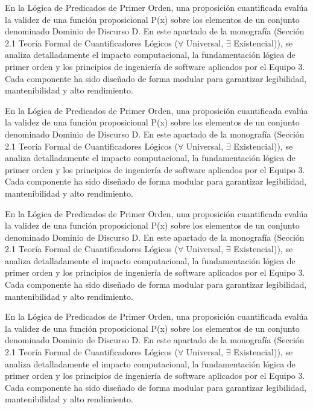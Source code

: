 \documentclass[11pt,a4paper]{article}
\begin{document}
En la Lógica de Predicados de Primer Orden, una proposición cuantificada
evalúa la validez de una función proposicional P(x) sobre los elementos
de un conjunto denominado Dominio de Discurso D. En este apartado de la
monografía (Sección 2.1 Teoría Formal de Cuantificadores Lógicos ($ \forall $
Universal, $ \exists $ Existencial)), se analiza detalladamente el impacto
computacional, la fundamentación lógica de primer orden y los principios
de ingeniería de software aplicados por el Equipo 3. Cada componente ha
sido diseñado de forma modular para garantizar legibilidad,
mantenibilidad y alto rendimiento.

En la Lógica de Predicados de Primer Orden, una proposición cuantificada
evalúa la validez de una función proposicional P(x) sobre los elementos
de un conjunto denominado Dominio de Discurso D. En este apartado de la
monografía (Sección 2.1 Teoría Formal de Cuantificadores Lógicos ($ \forall $
Universal, $ \exists $ Existencial)), se analiza detalladamente el impacto
computacional, la fundamentación lógica de primer orden y los principios
de ingeniería de software aplicados por el Equipo 3. Cada componente ha
sido diseñado de forma modular para garantizar legibilidad,
mantenibilidad y alto rendimiento.

En la Lógica de Predicados de Primer Orden, una proposición cuantificada
evalúa la validez de una función proposicional P(x) sobre los elementos
de un conjunto denominado Dominio de Discurso D. En este apartado de la
monografía (Sección 2.1 Teoría Formal de Cuantificadores Lógicos ($ \forall $
Universal, $ \exists $ Existencial)), se analiza detalladamente el impacto
computacional, la fundamentación lógica de primer orden y los principios
de ingeniería de software aplicados por el Equipo 3. Cada componente ha
sido diseñado de forma modular para garantizar legibilidad,
mantenibilidad y alto rendimiento.

En la Lógica de Predicados de Primer Orden, una proposición cuantificada
evalúa la validez de una función proposicional P(x) sobre los elementos
de un conjunto denominado Dominio de Discurso D. En este apartado de la
monografía (Sección 2.1 Teoría Formal de Cuantificadores Lógicos ($ \forall $
Universal, $ \exists $ Existencial)), se analiza detalladamente el impacto
computacional, la fundamentación lógica de primer orden y los principios
de ingeniería de software aplicados por el Equipo 3. Cada componente ha
sido diseñado de forma modular para garantizar legibilidad,
mantenibilidad y alto rendimiento.
\end{document}
